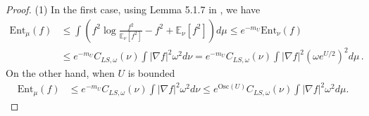 \documentclass[11pt,reqno]{amsart}
\numberwithin{equation}{section}
\theoremstyle{definition}
\theoremstyle{remark}
\def \Ent {\textrm{Ent}}
\def \Osc {\textrm{Osc}}
\begin{document}
\begin{proof}
(1) In the first case, using Lemma 5.1.7 in \cite{BakryGentilLedoux2014}, we have
    \begin{align*}
        \Ent_\mu(f)&\leq \int \left( f^2\log \frac{f^2}{\mathbb{E}_\nu[f^2]}-f^2+\mathbb{E}_\nu[f^2]\right) d\mu\leq e^{-m_U}\Ent_\nu(f)\\&\leq e^{-m_U} C_{LS, \omega}(\nu)\int\vert\nabla f\vert^2\omega^2 d\nu =e^{-m_U}C_{LS, \omega}(\nu)\int\vert\nabla f\vert^2(\omega e^{U/2})^2 d\mu\, .
    \end{align*}
    On the other hand, when $U$ is bounded
        \begin{align*}
        \Ent_\mu(f)&\leq e^{-m_U} C_{LS, \omega}(\nu) \int\vert\nabla f\vert^2\omega^2 d\nu \leq e^{\Osc(U)}C_{LS, \omega}(\nu)\int\vert\nabla f\vert^2\omega ^2 d\mu.
    \end{align*}


\end{proof}
\end{document}

